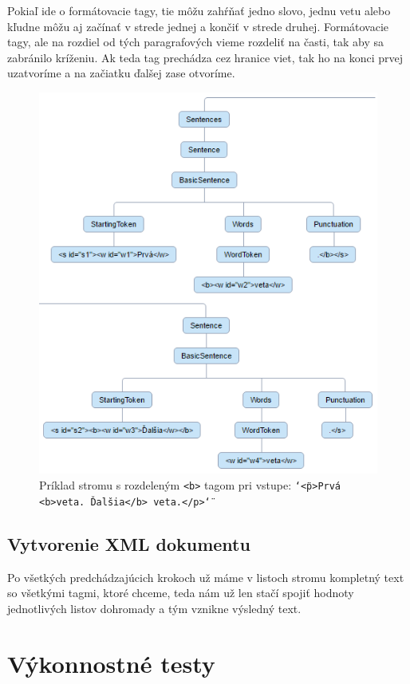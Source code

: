 \documentclass[12pt,a4paper]{report}
\theoremstyle{definition}
\theoremstyle{remark}
\begin{document}
Pokiaľ ide o formátovacie tagy, tie môžu zahŕňať jedno slovo, jednu vetu alebo kľudne môžu aj začínať v strede jednej a končiť v strede druhej. Formátovacie tagy, ale na rozdiel od tých paragrafových vieme rozdeliť na časti, tak aby sa zabránilo kríženiu. Ak teda tag prechádza cez hranice viet, tak ho na konci prvej uzatvoríme a na začiatku ďalšej zase otvoríme.
\begin{figure}[H]
\centering
\includegraphics[scale=2.6]{dividedFormattingTags}
\captionsetup{width=.7\linewidth}
\caption{Príklad stromu s rozdeleným \texttt{<b>} tagom pri vstupe: \texttt{\char`\"<p>Prvá <b>veta. Ďalšia</b> veta.</p>\char`\"}}
\end{figure}

\section{Vytvorenie XML dokumentu}
Po všetkých predchádzajúcich krokoch už máme v listoch stromu kompletný text so všetkými tagmi, ktoré chceme, teda nám už len stačí spojiť hodnoty jednotlivých listov dohromady a tým vznikne výsledný text.

\chapter{Výkonnostné testy} \label{tests}
\pgfplotsset{width=0.9\textwidth, height=10cm}
\end{document}
